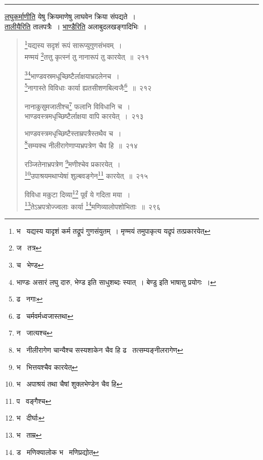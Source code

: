 \documentclass[11pt, openany]{book}
\begin{document}
\hrule

\vspace{2mm}
\underline{लघुकर्माणीति} येषु क्रियमाणेषु लाघवेन क्रिया संपद्यते~।\\

\underline{तालीयैरिति} तालपत्रैः~। \underline{भाण्डैरिति} अलाबुदलखङ्गादिभिः~।

\newpage

\begin{quote}
{\na \renewcommand{\thefootnote}{1}\footnote{भ \textendash\ यद्यस्य यादृशं कर्म तद्रूपं गुणसंयुतम्~। मृण्मयं तमुपाकृत्य यद्रृपं तत्प्रकारयेत्}यद्यस्य सदृशं रूपं सारूप्युगुणसंभवम्~।\\
मण्मयं \renewcommand{\thefootnote}{2}\footnote{ज \textendash\ तत्र}तत्तु कृत्स्नं तु नानारूपं तु कारयेत्~॥~२११

\renewcommand{\thefootnote}{3}\footnote{च \textendash\ भेण्ड}\renewcommand{\thefootnote}{*}\footnote{भाण्डः असारं लघु दारु, भेण्ड इति साधुशब्दः स्यात्~। {\qt बेण्डु} इति भाषासु प्रयोगः~।}भाण्डवस्रमधूच्छिष्टैर्लाक्षयाभ्रदलेनच~।\\
\renewcommand{\thefootnote}{4}\footnote{ढ \textendash\ नगाः}नागास्ते विविधाः कार्या ह्यतसीशणबिल्वजैः\renewcommand{\thefootnote}{5}\footnote{ढ \textendash\ चर्मवर्मध्वजास्तथा}~॥~२१२

नानाकुसुमजातीश्च\renewcommand{\thefootnote}{6}\footnote{न \textendash\ जात्यश्च} फलानि विविधानि च~।\\
भाण्डवस्त्रमधृच्छिष्टैर्लाक्षया वापि कारयेत्~।~२१३

भाण्डवस्त्रमधृच्छिष्टैस्ताम्रपत्रैस्तथैव च~।\\
\renewcommand{\thefootnote}{7}\footnote{भ \textendash\ नीलीरागेण चान्यैश्च सस्यशाकेन चैव हि ढ \textendash\ तत्सम्यङ्नीलरागेण}सम्यक्च नीलीरागेणाप्यभ्रपत्रेण चैव हि~॥~२१४

रञ्जितेनाभ्रपत्रेण \renewcommand{\thefootnote}{8}\footnote{भ \textendash\ भित्तयश्चैव कारयेत्}मणीश्चेव प्रकारयेत्~।\\
\renewcommand{\thefootnote}{9}\footnote{भ \textendash\ अपाश्रयं तथा चैषां शुक्लभेण्डेन चैव हि}उपाश्रयमथाप्येषां शुल्बवङ्गेन\renewcommand{\thefootnote}{10}\footnote{प \textendash\ वङ्गैश्च} कारयेत्~॥~२१५

विविधा मकुटा दिव्या\renewcommand{\thefootnote}{11}\footnote{भ \textendash\ दीर्घाः} पूर्वं ये गदिता मया~।\\
\renewcommand{\thefootnote}{12}\footnote{भ \textendash\ ताम्र}तेऽभ्रपत्रोज्ज्वलाः कार्या \renewcommand{\thefootnote}{13}\footnote{ड \textendash\ मणिक्यालोक भ \textendash\ मणिप्रद्योत}मणिव्यालोपशोभिताः~॥~२९६}
\end{quote}
\end{document}
